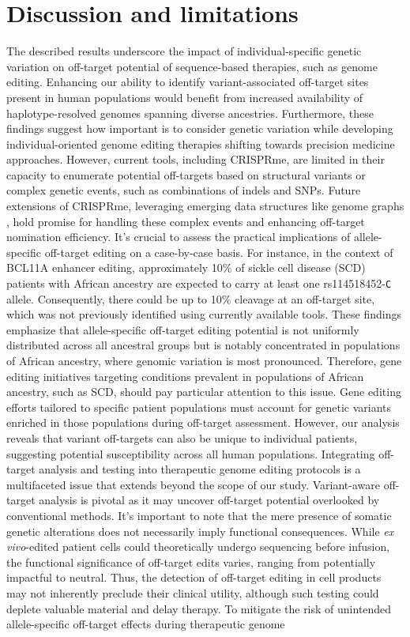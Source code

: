 \documentclass[a4paper, titlepage, openright]{book}
\newcommand{\crisprme}{CRISPRme\xspace}
\begin{document}
\section{Discussion and limitations}
The described results underscore the impact of individual-specific genetic variation on off-target potential of sequence-based therapies, such as genome editing. Enhancing our ability to identify variant-associated off-target sites present in human populations would benefit from increased availability of haplotype-resolved genomes spanning diverse ancestries. Furthermore, these findings suggest how important is to consider genetic variation while developing individual-oriented genome editing therapies shifting towards precision medicine approaches. However, current tools, including \crisprme, are limited in their capacity to enumerate potential off-targets based on structural variants or complex genetic events, such as combinations of indels and SNPs. Future extensions of \crisprme, leveraging emerging data structures like genome graphs \citep{paten2017genome, garrison2018variation}, hold promise for handling these complex events and enhancing off-target nomination efficiency. It's crucial to assess the practical implications of allele-specific off-target editing on a case-by-case basis. For instance, in the context of BCL11A enhancer editing, approximately 10\% of sickle cell disease (SCD) patients with African ancestry are expected to carry at least one rs114518452-\texttt{C} allele. Consequently, there could be up to 10\% cleavage at an off-target site, which was not previously identified using currently available tools. These findings emphasize that allele-specific off-target editing potential is not uniformly distributed across all ancestral groups but is notably concentrated in populations of African ancestry, where genomic variation is most pronounced. Therefore, gene editing initiatives targeting conditions prevalent in populations of African ancestry, such as SCD, should pay particular attention to this issue. Gene editing efforts tailored to specific patient populations must account for genetic variants enriched in those populations during off-target assessment. However, our analysis reveals that variant off-targets can also be unique to individual patients, suggesting potential susceptibility across all human populations. Integrating off-target analysis and testing into therapeutic genome editing protocols is a multifaceted issue that extends beyond the scope of our study. Variant-aware off-target analysis is pivotal as it may uncover off-target potential overlooked by conventional methods. It's important to note that the mere presence of somatic genetic alterations does not necessarily imply functional consequences. While \emph{ex vivo}-edited patient cells could theoretically undergo sequencing before infusion, the functional significance of off-target edits varies, ranging from potentially impactful to neutral. Thus, the detection of off-target editing in cell products may not inherently preclude their clinical utility, although such testing could deplete valuable material and delay therapy. To mitigate the risk of unintended allele-specific off-target effects during therapeutic genome 
\end{document}
